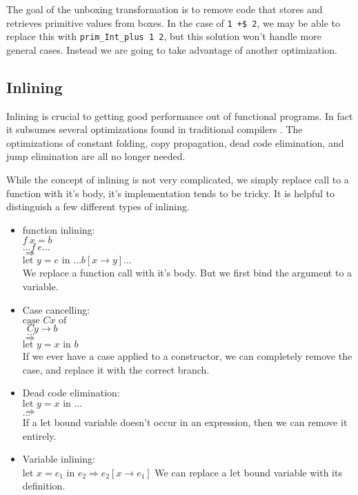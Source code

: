 \documentclass{article}
\begin{document}
The goal of the unboxing transformation is to remove code that stores and retrieves primitive values from boxes.
In the case of \texttt{1 +\$ 2}, we may be able to replace this with \texttt{prim\_Int\_plus 1 2},
but this solution won't handle more general cases.
Instead we are going to take advantage of another optimization.

\subsection{Inlining}

Inlining is crucial to getting good performance out of functional programs. \cite{inlining}
In fact it subsumes several optimizations found in traditional compilers \cite{inlining, appelComp, appelCont}.
The optimizations of constant folding, copy propagation, dead code elimination, and jump elimination are all
no longer needed.

While the concept of inlining is not very complicated, we simply replace call to a function with it's body,
it's implementation tends to be tricky. \cite{inlining}
It is helpful to distinguish a few different types of inlining.
\begin{itemize}
    \item function inlining:\\
        $f\ x = b$\\
        $... f\ e ...$\\
        $\Rightarrow$\\
        $\text{let } y = e \text{ in } ... b[x \to y] ...$\\
        We replace a function call with it's body.
        But we first bind the argument to a variable.
    \item Case cancelling:\\
        $\text{case } C x \text{ of }$\\
        $\ \ ...$\\
        $\ \ C y \rightarrow b$\\
        $\ \ ...$\\
        $\Rightarrow$\\
        $\text{let } y = x \text{ in } b$\\
        If we ever have a case applied to a constructor,
        we can completely remove the case, and replace it with the correct branch.
    \item Dead code elimination:\\
        $\text{let } y = x \text{ in } ...$\\
        $\Rightarrow$\\
        $...$\\
        If a let bound variable doesn't occur in an expression, then we can remove it entirely.
    \item Variable inlining:\\
        $\text{let } x = e_1 \text{ in } e_2 \Rightarrow e_2[x \to e_1]$
        We can replace a let bound variable with its definition.
\end{itemize}
\end{document}

